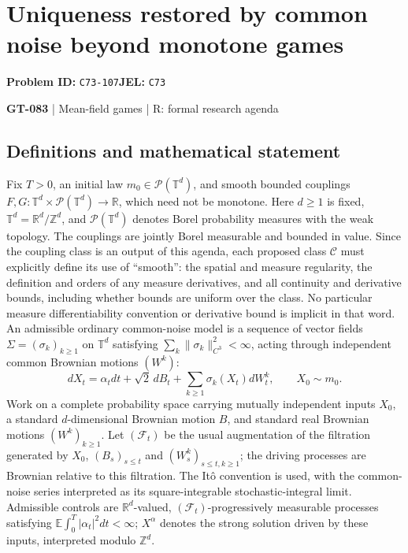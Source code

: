 \documentclass[11pt,a4paper]{article}
\newcommand{\R}{\mathbb R}
\begin{document}
\section*{Uniqueness restored by common noise beyond monotone games}
\textbf{Problem ID:} \texttt{C73-107}\quad \textbf{JEL:} \texttt{C73}\par
\label{problem:OP-0213}
\label{game:GT-083}
{\sffamily\small\color{muted}
{\small\textbf{GT-083} | Mean-field games | R: formal research agenda\par}
\par}
\subsection*{Definitions and mathematical statement}
Fix $T>0$, an initial law $m_0\in\mathcal P(\mathbb T^d)$, and smooth bounded couplings $F,G:\mathbb T^d\times\mathcal P(\mathbb T^d)\to\mathbb R$, which need not be monotone. Here $d\geq1$ is fixed, $\mathbb T^d=\R^d/\mathbb Z^d$, and $\mathcal P(\mathbb T^d)$ denotes Borel probability measures with the weak topology. The couplings are jointly Borel measurable and bounded in value. Since the coupling class is an output of this agenda, each proposed class $\mathcal C$ must explicitly define its use of ``smooth'': the spatial and measure regularity, the definition and orders of any measure derivatives, and all continuity and derivative bounds, including whether bounds are uniform over the class. No particular measure differentiability convention or derivative bound is implicit in that word. An admissible ordinary common-noise model is a sequence of vector fields $\Sigma=(\sigma_k)_{k\geq1}$ on $\mathbb T^d$ satisfying $\sum_k\|\sigma_k\|_{C^3}^2<\infty$, acting through independent common Brownian motions $(W^k)$:
\[
 dX_t=\alpha_tdt+\sqrt2\,dB_t+\sum_{k\geq1}\sigma_k(X_t)dW_t^k,
 \qquad X_0\sim m_0.
\]
Work on a complete probability space carrying mutually independent inputs $X_0$, a standard $d$-dimensional Brownian motion $B$, and standard real Brownian motions $(W^k)_{k\geq1}$. Let $(\mathcal F_t)$ be the usual augmentation of the filtration generated by $X_0$, $(B_s)_{s\leq t}$ and $(W_s^k)_{s\leq t,k\geq1}$; the driving processes are Brownian relative to this filtration. The It\^o convention is used, with the common-noise series interpreted as its square-integrable stochastic-integral limit. Admissible controls are $\R^d$-valued, $(\mathcal F_t)$-progressively measurable processes satisfying $\mathbb E\int_0^T|\alpha_t|^2dt<\infty$; $X^\alpha$ denotes the strong solution driven by these inputs, interpreted modulo $\mathbb Z^d$.
\end{document}
